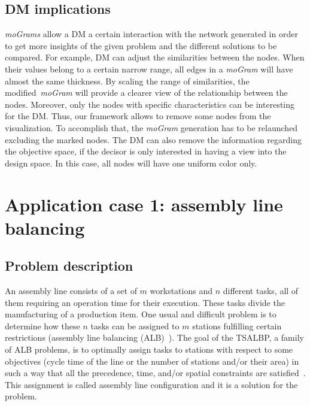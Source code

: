 \documentclass[journal]{IEEEtran}
\begin{document}
\subsection{DM implications}
\label{sec:dmimplic}


\emph{moGrams} allow a DM a certain interaction with the network generated in order to get more insights of the given problem and the different solutions to be compared. For example, DM can adjust the similarities between the nodes. When their values belong to a certain narrow range, all edges in a \emph{moGram} will have almost the same thickness. By scaling the range of similarities, the modified~\emph{moGram} will provide a clearer view of the relationship between the nodes. Moreover, only the nodes with specific characteristics can be interesting for the DM. Thus, our framework allows to remove some nodes from the visualization. To accomplish that, the \emph{moGram} generation has to be relaunched excluding the marked nodes. The DM can also remove the information regarding the objective space, if the decisor is only interested in having a view into the design space. In this case, all nodes will have one uniform color only.





\section{Application case 1: assembly line balancing}
\label{sec:appcase1}

\subsection{Problem description}


An assembly line consists of a set of $m$ workstations and $n$ different tasks, all of them requiring an operation time for their execution. These tasks divide the manufacturing of a production item. One usual and difficult problem is to determine how these $n$ tasks can be assigned to $m$ stations fulfilling certain restrictions (assembly line balancing (ALB)~\cite{Battaia13}). The goal of the TSALBP, a family of ALB problems, is to optimally assign tasks to stations with respect to some objectives (cycle time of the line or the number of stations and/or their area) in such a way that all the precedence, time, and/or spatial constraints are satisfied~\cite{Chica10Ins}. This assignment is called assembly line configuration and it is a solution for the problem.
\end{document}
